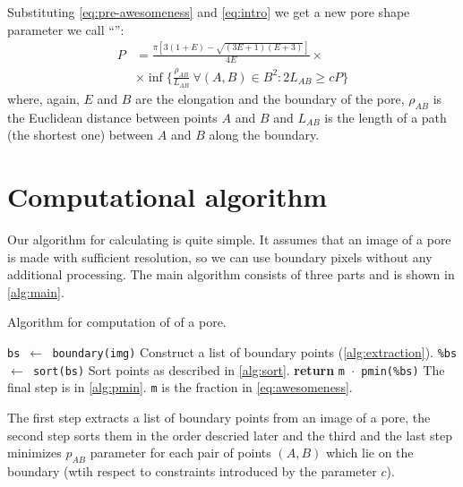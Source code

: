 \documentclass[reprint,amsmath,amssymb,aps,pre,showkeys,showpacs]{revtex4-1}
\newcommand{\highlight}[1]{{\color{red}{#1}}} %
\begin{document}
Substituting \cref{eq:pre-awesomeness} and \cref{eq:intro} we get a new pore
shape parameter we call ``\highlight{awesomeness}'':
\begin{equation}
  \begin{aligned}
    P &= \frac{\pi [3(1+E) - \sqrt{(3E+1)(E+3)}]}{4E} \times \\
    & \times \inf \{\frac{\rho_{AB}}{L_{AB}} \ \forall (A, B) \in B^2 : 2
    L_{AB} \ge cP \}
  \end{aligned}
  \label{eq:awesomeness}
\end{equation}
where, again, $E$ and $B$ are the elongation and the boundary of the pore,
$\rho_{AB}$ is the Euclidean distance between points $A$ and $B$ and $L_{AB}$ is
the length of a path (the shortest one) between $A$ and $B$ along the boundary.

\section{Computational algorithm}
\label{seq:alg}
Our algorithm for calculating \highlight{awesomeness} is quite simple. It
assumes that an image of a pore is made with sufficient resolution, so we can
use boundary pixels without any additional processing. The main algorithm
consists of three parts and is shown in \cref{alg:main}.
\begin{algorithm}[H]
  \caption{Algorithm for computation of \highlight{awesomeness} of a pore.}
  \label{alg:main}
  \begin{algorithmic}[1]
    \State \texttt{bs $\gets$ boundary(img)}
    \Comment Construct a list of boundary points (\cref{alg:extraction}).
    \State \texttt{\%bs $\gets$ sort(bs)}
    \Comment Sort points as described in \cref{alg:sort}.
    \State \textbf{return} \texttt{m $\cdot$ pmin(\%bs)}
    \Comment The final step is in \cref{alg:pmin}. \texttt{m} is the fraction in
    \cref{eq:awesomeness}.
    \EndProcedure
  \end{algorithmic}
\end{algorithm}

The first step extracts a list of boundary points from an image of a pore, the
second step sorts them in the order descried later and the third and the last
step minimizes $p_{AB}$ parameter for each pair of points $(A, B)$ which lie on
the boundary (wtih respect to constraints introduced by the parameter $c$).
\end{document}
